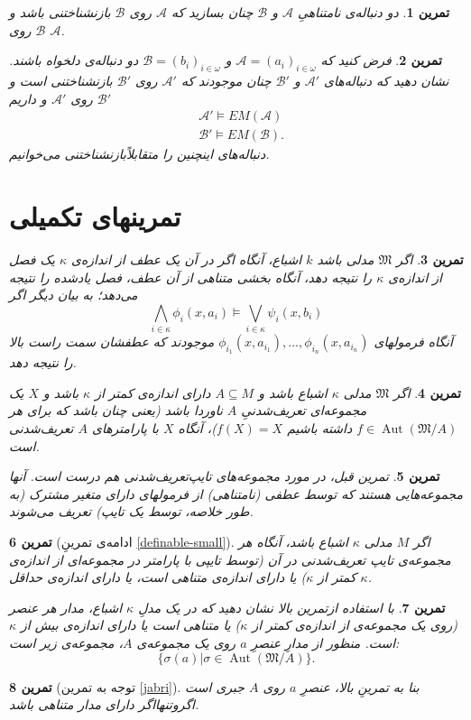 \documentclass[12pt,a4paper]{report}
\theoremstyle{colorhead}
\newtheorem{tam}{تمرین}
\DeclareMathOperator{\Aut}{Aut}
\begin{document}
\begin{tam}
دو دنباله‌ی  نامتناهیِ
$\mathcal{A}$
و
$\mathcal{B}$
چنان بسازید که
$\mathcal{A}$
روی
$\mathcal{B}$
بازنشناختنی باشد و 
$\mathcal{B}$
روی
$\mathcal{A}$.
\end{tam}
\begin{tam}
فرض کنید که
$\mathcal{A}=(a_i)_{i\in \omega}$
و
$\mathcal{B}=(b_i)_{i\in \omega}$
دو دنباله‌ی دلخواه باشند. نشان دهید که دنباله‌های
$\mathcal{A}'$
و
$\mathcal{B}'$
چنان موجودند که 
$\mathcal{A}'$
روی
$\mathcal{B}'$
بازنشناختنی است و 
$\mathcal{B}'$
روی
$\mathcal{A}'$
و داریم
\begin{align*}
& \mathcal{A}'\models EM(\mathcal{A})\\
& \mathcal{B}'\models EM(\mathcal{B}).
\end{align*}
دنباله‌های اینچنین را متقابلاًبازنشناختنی می‌خوانیم. 
\end{tam}
\section*{تمرینهای تکمیلی}
\begin{tam}
اگر
$\mathfrak{M}$
مدلی باشد 
$k$
اشباع، آنگاه اگر در آن یک عطف از اندازه‌ی 
$\kappa$
یک فصل از اندازه‌ی 
$\kappa$
را نتیجه دهد، آنگاه بخشی متناهی از آن عطف، فصل یادشده را نتیجه می‌دهد؛ به بیان دیگر اگر
\[
\bigwedge_{i\in \kappa}\phi_i(x,a_i)\models \bigvee_{i\in \kappa}\psi_i(x,b_i)
\]
آنگاه فرمولهای 
$\phi_{i_1}(x,a_{i_1}),\ldots,\phi_{i_n}(x,a_{i_n})$
موجودند که عطفشان سمت راست بالا را نتیجه دهد.
\end{tam}
\begin{tam}
اگر
$\mathfrak{M}$
مدلی
$\kappa$
اشباع باشد و 
$A\subseteq M$
دارای اندازه‌ی کمتر از
$\kappa$
باشد و 
$X$
یک
مجموعه‌ای تعریف‌شدنیِ
$A$
ناوردا باشد (یعنی چنان باشد 
 که برای هر
$f\in \Aut(\mathfrak{M}/A)$
داشته باشیم
$f(X)=X$)، 
آنگاه 
$X$
با پارامترهای 
$A$
تعریف‌شدنی است. 
\end{tam}
\begin{tam}
تمرین قبل، در مورد مجموعه‌های تایپ‌تعریف‌شدنی هم درست است. آنها مجموعه‌هایی 
هستند که توسط عطفی (نامتناهی)‌ از فرمولهای دارای متغیر مشترک (به طور خلاصه، توسط یک تایپ)‌
تعریف می‌شوند. 
\end{tam}
\begin{tam}[ادامه‌ی تمرینِ \ref{definable-small}]
اگر
$M$
مدلی
$\kappa$
اشباع باشد، آنگاه هر مجموعه‌ی تایپ تعریف‌شدنی در آن (توسط تایپی با پارامتر در
مجموعه‌ای از اندازه‌ی کمتر از
$\kappa$)
یا دارای اندازه‌ی متناهی است، یا دارای اندازه‌ی حداقل 
$\kappa$.
\end{tam}
\begin{tam}
با استفاده ازتمرین بالا نشان دهید که در یک مدلِ
$\kappa$
اشباع، مدار هر عنصر 
(روی یک مجموعه‌ی از اندازه‌ی
کمتر از
$\kappa$)
یا متناهی است یا دارای اندازه‌ی بیش از
$\kappa$
است. منظور از مدارِ عنصرِ
$a$
روی یک مجموعه‌ی
$A$،
مجموعه‌ی زیر است:
\[
\{\sigma(a)|\sigma\in \Aut(\mathfrak{M}/A)\}.
\]
\end{tam}
\begin{tam}[توجه به تمرین \ref{jabri}]
بنا به تمرینِ بالا، عنصرِ
$a$
روی
$A$
جبری است اگروتنهااگر دارای مدار متناهی باشد.
\end{tam}
\end{document}
